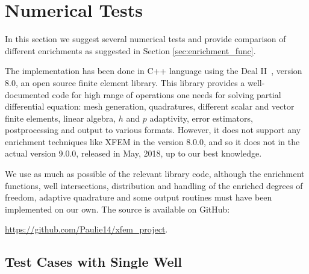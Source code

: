 \section{Numerical Tests}
\label{sec:pressure_results}

In this section we suggest several numerical tests and provide comparison of different enrichments
as suggested in Section \ref{sec:enrichment_func}.

The implementation has been done in C++ language using the Deal II~\cite{bangerth_deal.ii_2007}, version 8.0, 
an open source finite element library. This library provides a well-documented code for high range of operations one needs
for solving partial differential equation: mesh generation, quadratures, different scalar and vector finite elements,
linear algebra, $h$ and $p$ adaptivity, error estimators, postprocessing and output to various formats.
However, it does not support any enrichment techniques like XFEM in the version 8.0.0,
and so it does not in the actual version 9.0.0, released in May, 2018, up to our best knowledge.

We use as much as possible of the relevant library code, although the enrichment functions, well intersections,
distribution and handling of the enriched degrees of freedom, adaptive quadrature and some output routines
must have been implemented on our own.
The source is available on GitHub:
\begin{center}\url{https://github.com/Paulie14/xfem_project}.\end{center}


\subsection{Test Cases with Single Well}
\label{sec:2d_results_single}



